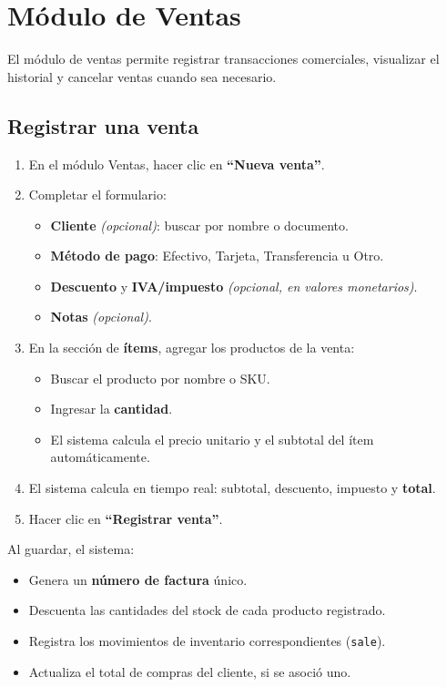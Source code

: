 \section{Módulo de Ventas}\label{muxf3dulo-de-ventas}

El módulo de ventas permite registrar transacciones comerciales, visualizar el historial y cancelar ventas cuando sea necesario.

\subsection{Registrar una venta}\label{registrar-una-venta}

\begin{enumerate}
\def\labelenumi{\arabic{enumi}.}
\tightlist
\item
  En el módulo Ventas, hacer clic en \textbf{``Nueva venta''}.
\item
  Completar el formulario:

  \begin{itemize}
  \tightlist
  \item
    \textbf{Cliente} \emph{(opcional)}: buscar por nombre o documento.
  \item
    \textbf{Método de pago}: Efectivo, Tarjeta, Transferencia u Otro.
  \item
    \textbf{Descuento} y \textbf{IVA/impuesto} \emph{(opcional, en valores monetarios)}.
  \item
    \textbf{Notas} \emph{(opcional)}.
  \end{itemize}
\item
  En la sección de \textbf{ítems}, agregar los productos de la venta:

  \begin{itemize}
  \tightlist
  \item
    Buscar el producto por nombre o SKU.
  \item
    Ingresar la \textbf{cantidad}.
  \item
    El sistema calcula el precio unitario y el subtotal del ítem automáticamente.
  \end{itemize}
\item
  El sistema calcula en tiempo real: subtotal, descuento, impuesto y \textbf{total}.
\item
  Hacer clic en \textbf{``Registrar venta''}.
\end{enumerate}

Al guardar, el sistema:

\begin{itemize}
\tightlist
\item
  Genera un \textbf{número de factura} único.
\item
  Descuenta las cantidades del stock de cada producto registrado.
\item
  Registra los movimientos de inventario correspondientes (\texttt{sale}).
\item
  Actualiza el total de compras del cliente, si se asoció uno.
\end{itemize}

